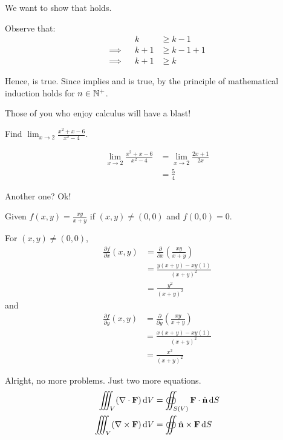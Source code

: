 \documentclass[]{plaid-homework}
\begin{document}
\IS We want to show that \pkpo holds.

Observe that:
\begin{align*}
          && k &\geq k - 1 \tag{by IH}
\\\implies&& k + 1 &\geq k - 1 + 1 \tag{adding 1 to both sides}
\\\implies&& k + 1 &\geq k \tag{evaluating $1 - 1 = 0$}
\end{align*}

Hence, \pk is true. Since \pk implies \pkpo and  is true, by the principle of mathematical induction \pn holds for $n \in \mathbb{N}^+$.

\newpage

Those of you who enjoy calculus will have a blast!

Find $\lim_{x\rightarrow2}\frac{x^2 + x - 6}{x^2 - 4}$.

\begin{align*}
  \lim_{x\rightarrow2}\frac{x^2 + x - 6}{x^2 - 4} &= \lim_{x\rightarrow2}\frac{2x+1}{2x} \tag{by L'Hôpital's Rule}\\
  &= \frac{5}{4}
\end{align*}

Another one? Ok!

Given $f(x,y) = \frac{xy}{x+y}$ if $(x,y) \neq (0,0)$ and $f(0,0) = 0$. 

For $(x,y) \neq (0,0)$, 
\begin{align*}
    \frac{\partial f}{\partial x}(x,y) &= \frac{\partial }{\partial x}\left(\frac{xy}{x+y}\right) \tag{by substitution}\\
    &= \frac{y(x+y)-xy(1)}{(x+y)^2} \tag{by differentiation rules}\\
    &= \frac{y^2}{(x+y)^2}
\end{align*}
and
\begin{align*}
  \frac{\partial f}{\partial y}(x,y) &= \frac{\partial }{\partial y}\left(\frac{xy}{x+y}\right) \tag{by substitution}\\
  &= \frac{x(x+y)-xy(1)}{(x+y)^2} \tag{by differentiation rules}\\
  &= \frac{x^2}{(x+y)^2}
\end{align*}

Alright, no more problems. Just two more equations.
\begin{align*}
  \iiint_{V} (\nabla \cdot \mathbf{F}) \operatorname{d\!} V
  &= \oiint_{S(V)} \mathbf{F} \cdot \hat{\mathbf{n}} \operatorname{d\!} S\\
  \iiint_{V} (\nabla \times \mathbf{F}) \operatorname{d\!} V
  &= \oiint \hat{\mathbf{n}} \times \mathbf{F} \operatorname{d\!} S
\end{align*}
\end{document}
